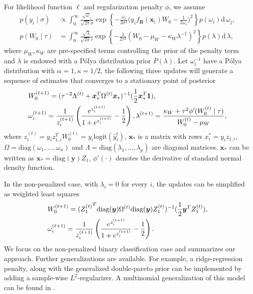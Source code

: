\documentclass[ba]{imsart}
\newcommand{\bm}[1]{\boldsymbol{#1}}
\renewcommand{\d}{\mathrm{d}}
\def\B{\bm{B}}
\def\x{\bm{x}}
\renewcommand{\d}{\mathrm{d}\,}
\newcommand{\bx}{{\bm x}}
\newcommand{\by}{{\bm y}}
\numberwithin{equation}{section}
\theoremstyle{plain}
\begin{document}
 For likelihood function $\ell$ and  regularization penalty $\phi$, we assume
\begin{align}
p(y_i \mid \sigma)&\propto \int_{0}^\infty \frac{\sqrt \omega_i}{\sqrt{2\pi}\sigma}\exp\left\{
-\frac{\omega_i}{2\sigma^2} \big(y_if_{\B}(\x_i) W_0-\frac{1}{2\omega_i}\big)^2\right\}  p(\omega_i) \d\omega_j,\\
p(W_{0}\mid \tau)&=\int_0^\infty\frac{\sqrt{\lambda}}{\sqrt{2\pi}\tau} \exp\left\{-\frac{\lambda}{2\tau^2} (W_{0}-\mu_W-\kappa_W\lambda^{-1})^2\right\}p(\lambda)\d\lambda,
\end{align}
where $\mu_W, \kappa_W$ are pre-specified terms controlling the prior of the penalty term and $\lambda$ is endowed with a P\'{o}lya distribution prior $P(\lambda)$. Let $\omega_i^{-1}$ have a P\'{o}lya distribution with $\alpha=1,\kappa=1/2$, the following three updates will generate a sequence of estimates that converges to a stationary point of posterior
\begin{align*}
\displaystyle
& W_0^{(t+1)}=(\tau^{-2}\Lambda^{(t)}+\bx_*^T \Omega^{(t)}\bx_*)^{-1}(\frac{1}{2}\bx^T_*\mathbf{1}),\\
&  \omega_i^{(t+1)}=\frac{1}{z_i^{(t+1)}}\left( \frac{e^{z_i^{(t+1)}}}{1+e^{z_i^{(t+1)}}}-\frac{1}{2}\right),  \lambda^{(t+1)} =\frac{\kappa_W+\tau^2 \phi'(W_{0}^{(t)}\mid \tau)}{W_{0}^{(t)}-\mu_W},
\end{align*}
where $z_i^{(t)}=y_i z_{1,i}^T{W_0^{(t)}}=y_i \text{logit}(\hat y_i^{t})$, $\bx_*$ is a matrix with rows $x_i^*=y_iz_{1,i}$,  $\Omega=\text{diag}(\omega_1, \ldots, \omega_n)$ and $\Lambda=\text{diag}(\lambda_1, \ldots, \lambda_p)$ are diagonal matrices. $\bx_*$ can be written as $\bx_*=\text{diag}(\by) Z_1$, $\phi'(\cdot)$ denotes the derivative of standard normal density function.

In the  non-penalized case, with $\lambda_i=0$ for every $i$, the updates can be simplified as weighted least squares
\begin{align*}
\displaystyle
& W_0^{(t+1)}=({Z_1^{(t)}}^T \text{diag}(\by) \Omega^{(t)}\text{diag}(\by)Z_1^{(t)})^{-1}(\frac{1}{2} \by^T{Z_1^{(t)}} ),\\
&  \omega_i^{(t+1)}=\frac{1}{z_i^{(t+1)}}\left( \frac{e^{z_i^{(t+1)}}}{1+e^{z_i^{(t+1)}}}-\frac{1}{2}\right).
\end{align*}
We focus on the non-penalized binary classification case and  summarizes our approach. Further generalizations are available. For example, a ridge-regression penalty, along with the generalized double-pareto prior \citep{armagan2013generalized} can be implemented by adding a sample-wise $L^2$-regularizer. A multinomial generalization of this model can be found in \citet{polson2013data}.
\end{document}
